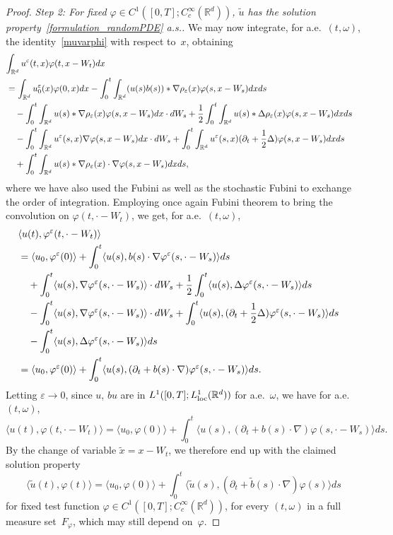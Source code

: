 \documentclass[a4paper,10pt]{article}
\newcommand\1{\mathbbm{1}}
\newcommand{\mr}{\mathbb{R}}
\newcommand{\lan}{\langle}
\newcommand{\ran}{\rangle}
\newcommand{\td}{\tilde}
\newcommand{\eps}{\varepsilon}
\newcommand\loc{{\rm loc}}
\numberwithin{equation}{section}
\begin{document}
\begin{proof}
\emph{Step 2: For fixed $\varphi \in C^1([0,T];C^\infty_c(\mr^d))$, $\td{u}$ has the solution property~\eqref{formulation_randomPDE} a.s..} We may now integrate, for a.e.~$(t,\omega)$, the identity~\eqref{muvarphi} with respect to~$x$, obtaining 
\begin{align}
\label{eqn_u_eps_tested_3}
\lefteqn{\int_{\mr^d} u^\eps(t,x)\varphi(t,x-W_t) dx} \\
 & = \int_{\mr^d} u_0^\eps(x)\varphi(0,x) d x -\int^t_0\int_{\mr^d}( u(s)b(s))*\nabla\rho_\eps(x)\varphi(s,x-W_s) dx ds \nonumber\\
 & \quad -\int^t_0\int_{\mr^d} u(s)*\nabla\rho_\eps(x)\varphi(s,x-W_s) d x\cdot d W_s +\frac12\int^t_0\int_{\mr^d} u(s)*\Delta\rho_\eps(x)\varphi(s,x-W_s) dx ds \nonumber\\
 & \quad -\int^t_0\int_{\mr^d} u^\eps(s,x)\nabla\varphi(s,x-W_s) d x\cdot d W_s +\int^t_0\int_{\mr^d} u^\eps(s,x)(\partial_t+\frac12\Delta)\varphi(s,x-W_s) d x d s \nonumber\\
 & \quad +\int^t_0\int_{\mr^d} u(s)*\nabla\rho_\eps(x)\cdot\nabla\varphi(s,x-W_s) dx ds,\nonumber
\end{align}
where we have also used the Fubini as well as the stochastic Fubini to exchange the order of integration. Employing once again Fubini theorem to bring the convolution on $\varphi(t,\cdot-W_t)$, we get, for a.e.~$(t,\omega)$,
\begin{align}
\lefteqn{\lan u(t),\varphi^\eps(t,\cdot-W_t)\ran} \nonumber\\
 &= \lan u_0,\varphi^\eps(0)\ran + \int^t_0\lan u(s),b(s)\cdot\nabla\varphi^\eps(s,\cdot-W_s)\ran ds \nonumber\\
 & \quad +\int^t_0\lan u(s),\nabla\varphi^\eps(s,\cdot-W_s)\ran\cdot d W_s +\frac12\int^t_0\lan u(s),\Delta\varphi^\eps(s,\cdot-W_s)\ran ds \nonumber\\
 & \quad -\int^t_0\lan u(s),\nabla\varphi^\eps(s,\cdot-W_s)\ran\cdot d W_s + \int^t_0\lan u(s),(\partial_t+\frac12\Delta)\varphi^\eps(s,\cdot-W_s)\ran ds \nonumber\\
 & \quad -\int^t_0\lan u(s),\Delta\varphi^\eps(s,\cdot-W_s)\ran ds  \nonumber\\
 & = \lan u_0,\varphi^\eps(0) \ran + \int^t_0\lan u(s),(\partial_t+b(s)\cdot\nabla)\varphi^\eps(s,\cdot-W_s)\ran d s.\nonumber
\end{align}
Letting $\eps\rightarrow0$, since $ u$, $b u$ are in $L^1([0,T];L^1_\loc(\mr^d))$ for a.e.~$\omega$, we have for a.e.~$(t,\omega)$,
\begin{equation*}
\lan u(t),\varphi(t,\cdot-W_t)\ran = \lan u_0,\varphi(0)\ran +\int^t_0\lan u(s),(\partial_t+b(s)\cdot\nabla)\varphi(s,\cdot-W_s)\ran ds.
\end{equation*}
By the change of variable $\tilde{x}=x-W_t$, we therefore end up with the claimed solution property
\begin{equation}
\lan\td{u}(t),\varphi(t)\ran = \lan u_0,\varphi(0)\ran +\int^t_0\lan\td{u}(s),(\partial_t+\td{b}(s)\cdot\nabla)\varphi(s)\ran ds\label{almost_rCE}
\end{equation}
for fixed test function $\varphi \in C^1([0,T];C^\infty_c(\mr^d))$, for every $(t,\omega)$ in a full measure set~$F_\varphi$, which may still depend on~$\varphi$.


\end{proof}
\end{document}
